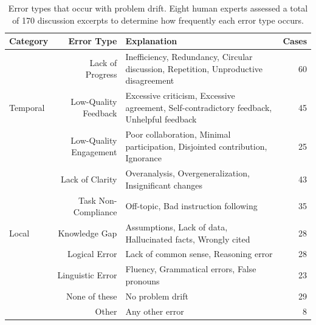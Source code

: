 \begin{table}[t]
\centering
\small
\begin{tabular}{p{2cm}rp{8cm}r}
\toprule
\textbf{Category} & \textbf{Error Type} & \textbf{Explanation} & \textbf{Cases}\\
\midrule
 & Lack of Progress & \tiny{Inefficiency, Redundancy, Circular discussion, Repetition, Unproductive disagreement} & 60 \\
Temporal & Low-Quality Feedback & \tiny{Excessive criticism, Excessive agreement, Self-contradictory feedback, Unhelpful feedback} & 45\\
 & Low-Quality Engagement & \tiny{Poor collaboration, Minimal participation, Disjointed contribution, Ignorance} & 25 \\
\midrule
 & Lack of Clarity & \tiny{Overanalysis, Overgeneralization, Insignificant changes} \hspace{5cm} & 43 \\
 & Task Non-Compliance &  \tiny{Off-topic, Bad instruction following} & 35\\
Local & Knowledge Gap & \tiny{Assumptions, Lack of data, Hallucinated facts, Wrongly cited} & 28 \\
 & Logical Error & \tiny{Lack of common sense, Reasoning error} & 28 \\
 & Linguistic Error & \tiny{Fluency, Grammatical errors, False pronouns} & 23 \\
\midrule
 & None of these & \tiny{No problem drift} & 29 \\
 & Other & \tiny{Any other error} & 8 \\
\bottomrule
\end{tabular}
\caption{Error types that occur with problem drift. Eight human experts assessed a total of 170 discussion excerpts to determine how frequently each error type occurs.\vspace{-0.5cm}}
\label{tab:reasons}
\end{table}

